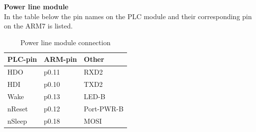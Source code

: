 \textbf{Power line module}\\
In the table below the pin names on the PLC module and their corresponding pin on the ARM7 is listed.
\begin{table}[H]
    \begin{tabular}{|p{4cm}|p{4cm}|p{4cm}|}
        \hline
        \textbf{PLC-pin} & \textbf{ARM-pin}& \textbf{Other}     \\ \hline
        HDO    & p0.11 & RXD2       \\ \hline
        HDI    & p0.10 & TXD2       \\ \hline
        Wake   & p0.13 & LED-B      \\ \hline
        nReset & p0.12 & Port-PWR-B \\ \hline
        nSleep & p0.18 & MOSI       \\
        \hline
    \end{tabular}
    \caption{Power line module connection}
\end{table}

